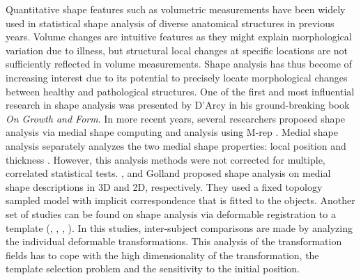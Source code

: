 \documentclass{InsightArticle}
\begin{document}
Quantitative shape features such as volumetric measurements have been widely used in statistical shape analysis of diverse anatomical structures in previous years. Volume changes are intuitive features as they might explain morphological variation due to illness, but structural local changes at specific locations are not sufficiently reflected in volume measurements. Shape analysis has thus become of increasing interest due to its potential to precisely locate morphological changes between healthy and pathological structures. One of the first and most influential research in shape analysis was presented by D’Arcy \cite{Thompson42} in his ground-breaking book \textit{On Growth and Form}. In more recent years, several researchers proposed shape analysis via medial shape computing and analysis using M-rep \cite{Styner03}. Medial shape analysis separately analyzes the two medial shape properties: local position and thickness \cite{Styner03_2}. However, this analysis methods were not corrected for multiple, correlated statistical tests. \cite{Pizer99}, and Golland \cite{Golland99} proposed shape analysis on medial shape descriptions in 3D and 2D, respectively. They used a fixed topology sampled model with implicit correspondence that is fitted to the objects. Another set of studies can be found on shape analysis via deformable registration to a template (\cite{Davatzikos96}, \cite{Joshi97}, \cite{Csernansky98}, \cite{Csernansky02}). In this studies, inter-subject comparisons are made by analyzing the individual deformable transformations. This analysis of the transformation fields has to cope with the high dimensionality of the transformation, the template selection problem and the sensitivity to the initial position. 
\end{document}
